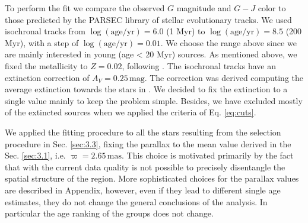 \documentclass[onecolumn]{aa} %
\begin{document}
\noindent 
To perform the fit we compare the observed $G$ magnitude and $G-J$ color to those predicted by the PARSEC \citep[PAdova and TRieste Stellar Evolution Code][]{Bressan2012, Chen2014, Tang2014}  library of stellar evolutionary tracks. We used isochronal tracks from $\mathrm{\log(age/yr) = 6.0}$ (1 Myr) to $\mathrm{\log(age/yr) = 8.5}$ (200 Myr), with a step of $\mathrm{\log(age/yr) = 0.01}$. We choose the range above since we are mainly interested in young (age < 20 Myr) sources. As mentioned above,  we fixed the metallicity to $Z = 0.02$, following \cite{Brown1994}. 
The isochronal tracks have an extinction correction of $A_V = 0.25 \, \mathrm{mag}$. The correction was derived computing the average  extinction towards the stars in \cite{Brown1994}.
We decided to fix the extinction to a single value mainly to keep the problem simple. Besides, we have excluded mostly of the extincted sources when we applied the criteria of Eq. \ref{eq:cuts}.
  
\noindent
We applied the fitting procedure to all the stars resulting from the selection procedure in Sec. \ref{sec:3.3}, fixing the parallax to the mean value derived in the Sec. \ref{sec:3.1}, i.e. $\varpi = 2.65 \, \mathrm{mas}$. This choice is motivated primarily by the fact that with the current data quality is not possible to precisely disentangle the spatial structure of the region. More sophisticated choices for the parallax values are described in Appendix, however, even if they lead to different single age estimates, they do not change the general conclusions of the analysis. In particular the age ranking of the groups does not change.
 
\end{document}
